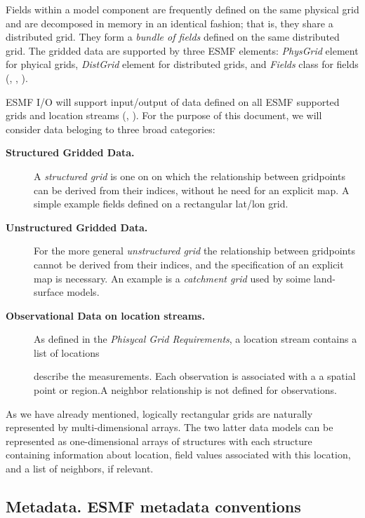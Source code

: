 Fields within a model component are frequently defined on the same
physical grid and are decomposed in memory in an identical fashion;
that is, they share a distributed grid. They form a {\em bundle of
fields} defined on the same distributed grid. The gridded data are
supported by three ESMF elements: {\em PhysGrid} element 
for phyical grids, {\em DistGrid} element for distributed grids, and 
{\em Fields} class for fields (\cite{ESMF-PhysGrid-Req},
\cite{ESMF-DistGrid-Req}, \cite{ESMF-Field-Req}). 

ESMF I/O will support input/output of data defined on all ESMF
supported grids and location streams (\cite{ESMF-PhysGrid-Req},
\cite{ESMF-DistGrid-Req}). For
the purpose of this document, we will consider data beloging to three
broad categories:

\begin{description}

\item[\bf Structured Gridded Data.] A {\em structured grid} is one on 
on which the relationship between gridpoints can be derived from their
indices, without he need for an explicit map.  A simple example fields
defined on a rectangular lat/lon grid.

\item[\bf Unstructured Gridded Data.] For the more general 
{\em unstructured grid} the relationship between gridpoints cannot be
derived from their indices, and the specification of an explicit map
is necessary.  An example is a {\em catchment grid} used by soime
land-surface models.

\item[\bf Observational Data on location streams.] As defined in the {\em Phisycal Grid Requirements}, a location stream contains a list of locations


describe the measurements. Each observation is 
associated with a a spatial point or region.A neighbor relationship is not 
defined for observations. 
\end{description}

As we have already mentioned, logically rectangular grids are naturally 
represented by multi-dimensional arrays. The two latter data models can be 
represented as one-dimensional arrays of structures with each structure 
containing information about location, field values associated with this 
location, and a list of neighbors, if relevant. 

\subsection{Metadata. ESMF metadata conventions}

